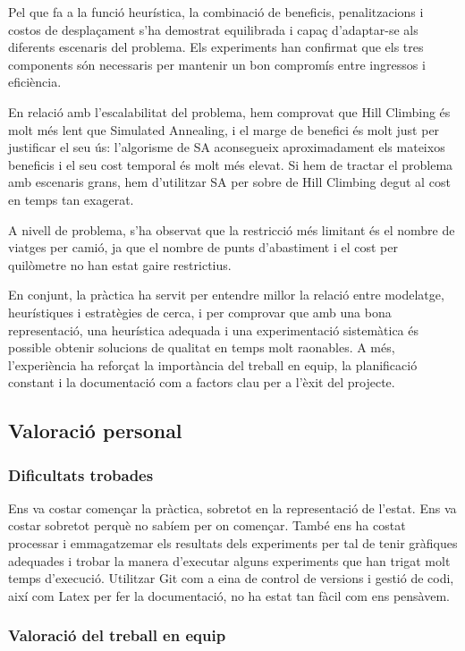 Pel que fa a la funció heurística, la combinació de beneficis, penalitzacions i costos de desplaçament s’ha demostrat equilibrada i capaç d’adaptar-se als diferents escenaris del problema. Els experiments han confirmat que els tres components són necessaris per mantenir un bon compromís entre ingressos i eficiència. 

En relació amb l'escalabilitat del problema, hem comprovat que Hill Climbing és molt més lent que Simulated Annealing, i el marge de benefici és molt just per justificar el seu ús: l'algorisme de SA aconsegueix aproximadament els mateixos beneficis i el seu cost temporal és molt més elevat. Si hem de tractar el problema amb escenaris grans, hem d'utilitzar SA per sobre de Hill Climbing degut al cost en temps tan exagerat.

A nivell de problema, s’ha observat que la restricció més limitant és el nombre de viatges per camió, ja que el nombre de punts d'abastiment i el cost per quilòmetre no han estat gaire restrictius.

En conjunt, la pràctica ha servit per entendre millor la relació entre modelatge, heurístiques i estratègies de cerca, i per comprovar que amb una bona representació, una heurística adequada i una experimentació sistemàtica és possible obtenir solucions de qualitat en temps molt raonables. A més, l’experiència ha reforçat la importància del treball en equip, la planificació constant i la documentació com a factors clau per a l’èxit del projecte. 

\subsection{Valoració personal}

\subsubsection{Dificultats trobades}
Ens va costar començar la pràctica, sobretot en la representació de l'estat. Ens va costar sobretot perquè no sabíem per on començar. També ens ha costat processar i emmagatzemar els resultats dels experiments per tal de tenir gràfiques adequades i trobar la manera d'executar alguns experiments que han trigat molt temps d'execució. Utilitzar Git com a eina de control de versions i gestió de codi, així com Latex per fer la documentació, no ha estat tan fàcil com ens pensàvem.



\subsubsection{Valoració del treball en equip}

